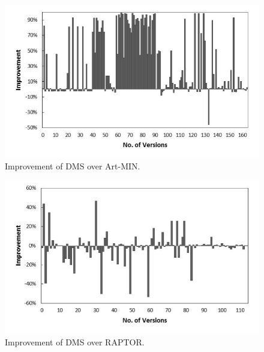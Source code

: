 \begin{figure}[tbp]
    \centering
    \includegraphics[width=12cm]{mut-dms-art.pdf}
    \caption{Improvement of D{\scriptsize MS} over A{\scriptsize rt}-M{\scriptsize IN}.}
    \label{fig:our_vs_artmin.multifault}
\end{figure}

\begin{figure}[tbp]
    \centering
    \includegraphics[width=12cm]{mut-dms-raptor.pdf}
\caption{Improvement of D{\scriptsize MS} over R{\scriptsize APTOR}.}
    \label{fig:our_vs_raptor.multifault}
\end{figure}


